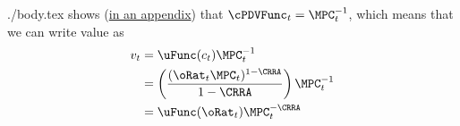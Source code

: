 \documentclass{handout}
\begin{document}
\begin{verbatimwrite}{./body.tex}
\cite{BufferStockTheory} shows (\href{http://www.econ2.jhu.edu/people/ccarroll/papers/BufferStockTheory/#MPCnvrsIsCPDV}{in an appendix}) that $\cPDVFunc_{t} = \MPC_{t}^{-1}$, which means that we can write value as
\begin{equation}\begin{gathered}\begin{aligned}
  v_{t} & =  \uFunc(c_{t})\MPC^{-1}_{t}
  \\ & =  \left(\frac{(\oRat_{t}\MPC_{t})^{1-\CRRA}}{1-\CRRA}\right)\MPC_{t}^{-1}
\\ & =  \uFunc(\oRat_{t})\MPC_{t}^{-\CRRA}           
\end{aligned}\end{gathered}\end{equation}

\end{verbatimwrite}



\end{document}
